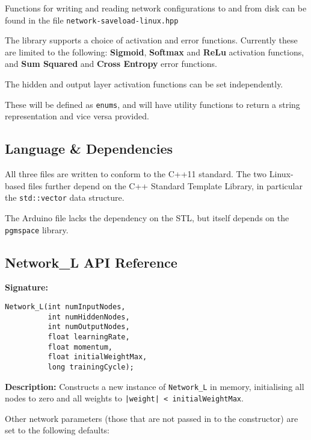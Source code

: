 \documentclass[a4paper]{article}
\begin{document}
Functions for writing and reading network configurations to and from disk can be found in the file \lstinline{network-saveload-linux.hpp}

The library supports a choice of activation and error functions. Currently these are limited to the following: \textbf{Sigmoid}, \textbf{Softmax} and \textbf{ReLu} activation functions, and \textbf{Sum Squared} and \textbf{Cross Entropy} error functions.

The hidden and output layer activation functions can be set independently.

These will be defined as \lstinline{enums}, and will have utility functions to return a string representation and vice versa provided.

\subsection{Language \& Dependencies}%
\label{subsec:dn_language}

All three files are written to conform to the C++11 standard\cite{nnref0}. The two Linux-based files further depend on the C++ Standard Template Library, in particular the \lstinline{std::vector} data structure.

The Arduino file lacks the dependency on the STL, but itself depends on the \lstinline{pgmspace} library.\cite{nnref1}

\newpage
\subsection{Network\_L API Reference}%
\label{subsec:dn_API_networkl}

\hrulefill %

\textbf{Signature:} \begin{lstlisting} 
Network_L(int numInputNodes,
          int numHiddenNodes,
          int numOutputNodes,
          float learningRate,
          float momentum,
          float initialWeightMax,
          long trainingCycle);
\end{lstlisting}

\textbf{Description: }
Constructs a new instance of \lstinline{Network_L} in memory, initialising all nodes to zero and all weights to \lstinline{|weight| < initialWeightMax}.

Other network parameters (those that are not passed in to the constructor) are set to the following defaults:
\end{document}
